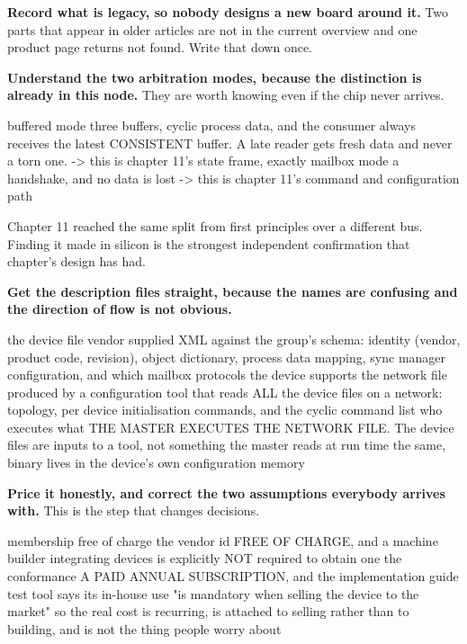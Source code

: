 \begin{steps}
\item \textbf{Record what is legacy, so nobody designs a new board around it.}
Two parts that appear in older articles are not in the current overview and one
product page returns not found. Write that down once.

\item \textbf{Understand the two arbitration modes, because the distinction is
already in this node.} They are worth knowing even if the chip never arrives.
\begin{plaincode}
buffered mode   three buffers, cyclic process data, and the consumer always
                receives the latest CONSISTENT buffer. A late reader gets
                fresh data and never a torn one.
                  -> this is chapter 11's state frame, exactly
mailbox mode    a handshake, and no data is lost
                  -> this is chapter 11's command and configuration path
\end{plaincode}
Chapter 11 reached the same split from first principles over a different bus.
Finding it made in silicon is the strongest independent confirmation that
chapter's design has had.

\item \textbf{Get the description files straight, because the names are
confusing and the direction of flow is not obvious.}
\begin{plaincode}
the device file   vendor supplied XML against the group's schema: identity
                  (vendor, product code, revision), object dictionary,
                  process data mapping, sync manager configuration, and
                  which mailbox protocols the device supports
the network file  produced by a configuration tool that reads ALL the device
                  files on a network: topology, per device initialisation
                  commands, and the cyclic command list
who executes what THE MASTER EXECUTES THE NETWORK FILE. The device files are
                  inputs to a tool, not something the master reads at run time
the same, binary  lives in the device's own configuration memory
\end{plaincode}

\item \textbf{Price it honestly, and correct the two assumptions everybody
arrives with.} This is the step that changes decisions.
\begin{plaincode}
membership          free of charge
the vendor id       FREE OF CHARGE, and a machine builder integrating
                    devices is explicitly NOT required to obtain one
the conformance     A PAID ANNUAL SUBSCRIPTION, and the implementation guide
test tool           says its in-house use "is mandatory when selling the
                    device to the market"
so the real cost    is recurring, is attached to selling rather than to
                    building, and is not the thing people worry about
\end{plaincode}


\end{steps}
